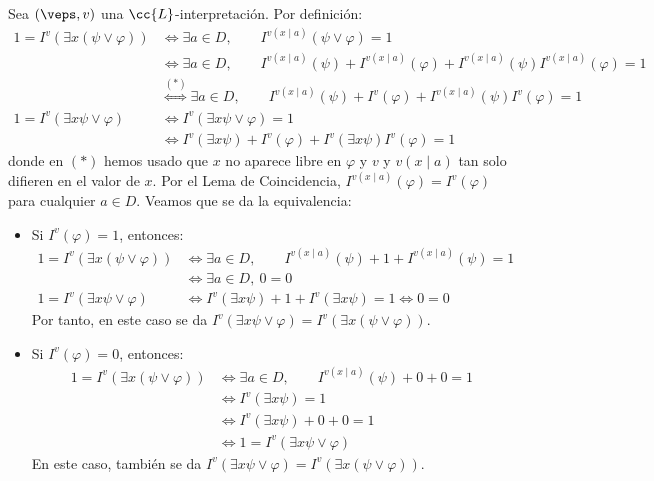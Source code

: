\begin{ejercicio}
\begin{enumerate}
        Sea $(\veps,v)$ una $\cc{L}$-interpretación. Por definición:
        \begin{align*}
            1 = I^v(\exists x(\psi \vee \varphi))
            &\iff \exists a\in D,\qquad I^{v(x\mid a)}(\psi \vee \varphi) = 1\\
            &\iff \exists a\in D,\qquad I^{v(x\mid a)}(\psi) + I^{v(x\mid a)}(\varphi) + I^{v(x\mid a)}(\psi)I^{v(x\mid a)}(\varphi) = 1\\
            &\stackrel{(\ast)}{\iff} \exists a\in D,\qquad I^{v(x\mid a)}(\psi) + I^{v}(\varphi) + I^{v(x\mid a)}(\psi)I^{v}(\varphi) = 1\\
            1 = I^v(\exists x \psi \vee \varphi)
            &\iff I^v(\exists x \psi \vee \varphi) = 1\\
            &\iff I^v(\exists x \psi) + I^v(\varphi) + I^v(\exists x \psi)I^v(\varphi) = 1
        \end{align*}
        donde en $(\ast)$ hemos usado que $x$ no aparece libre en $\varphi$ y $v$ y $v(x\mid a)$ tan solo difieren en el valor de $x$. Por el Lema de Coincidencia, $I^{v(x\mid a)}(\varphi) = I^v(\varphi)$ para cualquier $a\in D$.
        Veamos que se da la equivalencia:
        \begin{itemize}
            \item Si $I^v(\varphi)=1$, entonces:
            \begin{align*}
                1 = I^v(\exists x(\psi \vee \varphi)) &\iff \exists a\in D,\qquad I^{v(x\mid a)}(\psi) + 1 + I^{v(x\mid a)}(\psi) = 1\\
                &\iff \exists a\in D, \ 0=0\\
                1 = I^v(\exists x \psi \vee \varphi)
                &\iff I^v(\exists x \psi) + 1 + I^v(\exists x \psi) = 1 \iff 0=0
            \end{align*}
            Por tanto, en este caso se da $I^v(\exists x \psi \vee \varphi) = I^v(\exists x(\psi \vee \varphi))$.\\

            \item Si $I^v(\varphi)=0$, entonces:
            \begin{align*}
                1 = I^v(\exists x(\psi \vee \varphi)) &\iff \exists a\in D,\qquad I^{v(x\mid a)}(\psi) + 0 + 0= 1\\
                &\iff I^v(\exists x \psi) = 1\\
                &\iff I^v(\exists x \psi) + 0 + 0 = 1\\
                &\iff 1 = I^v(\exists x \psi \vee \varphi)
            \end{align*}
            En este caso, también se da $I^v(\exists x \psi \vee \varphi) = I^v(\exists x(\psi \vee \varphi))$.
        \end{itemize}
        

\end{enumerate}
\end{ejercicio}
